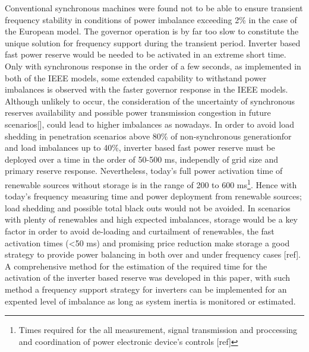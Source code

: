 Conventional synchronous machines were found not to be able to ensure transient frequency stability in conditions of power imbalance exceeding 2\% in the case of the European model. The governor operation is by far too slow to constitute the unique solution for frequency support during the transient period. Inverter based fast power reserve would be needed to be activated in an extreme short time. Only with synchronous response in the order of a few seconds, as implemented in both of the IEEE models, some extended capability to withstand power imbalances is observed with the faster governor response in the IEEE models. \\

Although unlikely to occur, the consideration of the uncertainty of synchronous reserves availability and possible power transmission congestion in future scenarios[], could lead to higher imbalances as nowadays. In order to avoid load shedding in penetration scenarios above 80\% of non-synchronous generationfor and load imbalances up to 40\%, inverter based fast power reserve must be deployed over a time in the order of 50-500 ms, independly of grid size and primary reserve response. Nevertheless, today’s full power activation time of renewable sources without storage is in the range of 200 to 600 ms\footnote{Times required for the all measurement, signal transmission and proccessing and coordination of power electronic device's controls [ref]}. Hence with today’s frequency measuring time and power deployment from renewable sources; load shedding and possible total black outs would not be avoided. In scenarios with plenty of renewables and high expected imbalances, storage would be a key factor in order to avoid de-loading and curtailment of renewables, the fast activation times (<50 ms) and promising price reduction make storage a good strategy to provide power balancing in both over and under frequency cases [ref]. A comprehensive method for the estimation of the required time for the activation of the inverter based reserve was developed in this paper, with such method a frequency support strategy for inverters can be implemented for an expented level of imbalance as long as system inertia is monitored or estimated.

